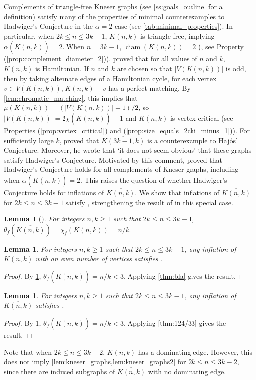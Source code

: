 \documentclass[11pt]{article}
\numberwithin{equation}{section}
\theoremstyle{plain}
\newtheorem{lem}[equation]{Lemma}
\theoremstyle{definition}
\renewcommand{\geq}{\geqslant}
\renewcommand{\leq}{\leqslant}
\DeclareMathOperator{\diam}{diam}
\newcommand{\propref}[1]{\textup{(\ref{#1})}}
\begin{document}
Complements of triangle-free Kneser graphs (see \cref{ss:goals_outline} for a definition) satisfy many of the properties of minimal counterexamples to Hadwiger's Conjecture in the $\alpha=2$ case (see \cref{tab:minimal_properties}). In particular, when $2k \leq n \leq 3k-1$, $K(n,k)$ is triangle-free, implying $\alpha(\overline{K(n,k)}) = 2$.
When $n = 3k - 1$, $\diam(K(n,k)) = 2$ (\citep{valencia2005diameter}, see Property \propref{prop:complement_diameter_2}). \citet{merino2023kneser} proved that for all values of $n$ and $k$, $K(n,k)$ is Hamiltonian. If $n$ and $k$ are chosen so that $|V(K(n,k))|$ is odd, then by taking alternate edges of a Hamiltonian cycle, for each vertex $v \in V(K(n,k))$, $K(n,k) - v$ has a perfect matching. By \cref{lem:chromatic_matching}, this implies that $\mu(K(n,k)) = (|V(K(n,k))| - 1) / 2$, so $|V(K(n,k))| = 2 \chi(\overline{K(n,k)}) - 1$ and $\overline{K(n,k)}$ is vertex-critical (see Properties \propref{prop:vertex_critical} and \propref{prop:size_equals_2chi_minus_1}).
For sufficiently large $k$, \citet{Thomassen05} proved that $\overline{K(3k-1,k)}$ is a counterexample to Haj{\'o}s’ Conjecture. Moreover, he wrote that `it does not seem obvious' that these graphs satisfy Hadwiger's Conjecture.
Motivated by this comment, \citet{XZ17} proved that Hadwiger's Conjecture holds for all complements of Kneser graphs, including when $\alpha(\overline{K(n,k)}) = 2$. This raises the question of whether Hadwiger's Conjecture holds for inflations of $\overline{K(n,k)}$. We show that inflations of $\overline{K(n,k)}$ for $2k \leq n \leq 3k - 1$ satisfy , strengthening the result of \citet{XZ17} in this special case.

\begin{lem}[\citep{SU97}]
    \label{lem:frac_chromatic_kneser}
    For integers $n,k \geq 1$ such that $2k \leq n \leq 3k - 1$, $\theta_f(\overline{K(n,k)}) = \chi_f(K(n,k))  = n/k$.
\end{lem}
\begin{lem}
    \label{lem:kneser_graphs}
    For integers $n,k \geq 1$ such that $2k \leq n \leq 3k - 1$, any inflation of $\overline{K(n,k)}$ with an even number of vertices satisfies .
\end{lem}
\begin{proof}
    By \cref{lem:frac_chromatic_kneser}, $\theta_f(\overline{K(n,k)})  = n/k < 3$. Applying \cref{thm:bla} gives the result.
\end{proof}
\begin{lem}
    \label{lem:kneser_graphs2}
    For integers $n,k \geq 1$ such that $2k \leq n \leq 3k - 1$, any inflation of $\overline{K(n,k)}$ satisfies .
\end{lem}
\begin{proof}
    By \cref{lem:frac_chromatic_kneser}, $\theta_f(\overline{K(n,k)})  = n/k < 3$. Applying \cref{thm:124/33} gives the result.
\end{proof}
Note that when $2k \leq n \leq 3k - 2$, $\overline{K(n,k)}$ has a dominating edge. However, this does not imply \cref{lem:kneser_graphs,lem:kneser_graphs2} for $2k \leq n \leq 3k - 2$, since there are induced subgraphs of $\overline{K(n,k)}$ with no dominating edge.
\end{document}
